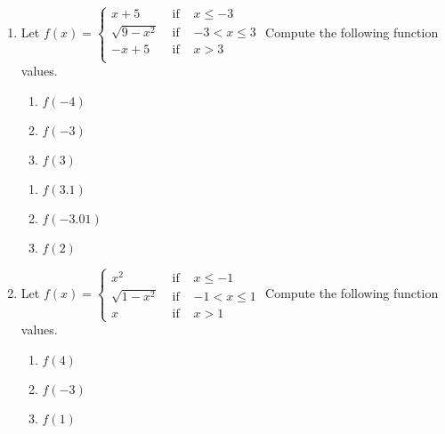 \begin{enumerate}

\item  Let $f(x) = \left\{  \begin{array}{rcr} x + 5 & \mbox{ if } & x \leq -3 \\ \sqrt{9-x^2} & \mbox{ if } & -3 < x \leq 3 \\ -x+5 & \mbox{ if } & x > 3 \\ \end{array}        \right.$\pp
Compute the following function values.

\begin{multicols}{3}
\begin{enumerate}

\item $f(-4)$
\item  $f(-3)$
\item  $f(3)$

\setcounter{HWindent}{\value{enumii}}
\end{enumerate}
\end{multicols}

\begin{multicols}{3}
\begin{enumerate}
\setcounter{enumii}{\value{HWindent}}

\item  $f(3.1)$
\item  $f(-3.01)$
\item  $f(2)$

\setcounter{HWindent}{\value{enumii}}
\end{enumerate}
\end{multicols}

\item Let ${\displaystyle f(x) = \left\{ \begin{array}{rcr}
x^{2} & \mbox{ if } & x \leq -1\\
\sqrt{1 - x^{2}} & \mbox{ if } & -1 < x \leq 1\\
x & \mbox{ if } & x > 1  \end{array} \right. }$\pp
Compute the following function values.

\begin{multicols}{3}
\begin{enumerate}

\item $f(4)$
\item $f(-3)$
\item $f(1)$


\end{enumerate}
\end{multicols}
\end{enumerate}
